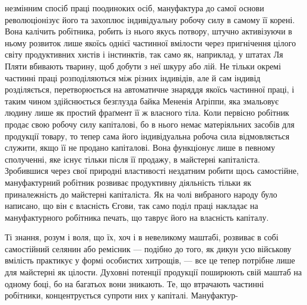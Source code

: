 \parcont{}  %
незмінним спосіб праці поодиноких осіб, мануфактура до самої
основи революціонізує його та захоплює індивідуальну робочу
силу в самому її корені. Вона калічить робітника, робить із нього
якусь потвору, штучно активізуючи в ньому розвиток лише
якоїсь однієї частинної вмілости через пригнічення цілого світу
продуктивних хистів і інстинктів, так само як, наприклад, у
штатах Ля Пляти вбивають тварину, щоб добути з неї шкуру
або лій. Не тільки окремі частинні праці розподіляються між
різних індивідів, але й сам індивід розділяється, перетворюється
на автоматичне знаряддя якоїсь частинної праці, і таким чином
здійснюється безглузда байка Мененія Аґріппи, яка змальовує
людину лише як простий фраґмент її ж власного тіла. Коли
первісно робітник продає свою робочу силу капіталові, бо в нього
немає матеріяльних засобів для продукції товару, то тепер сама
його індивідуальна робоча сила відмовляється служити, якщо
її не продано капіталові. Вона функціонує лише в певному сполученні,
яке існує тільки після її продажу, в майстерні капіталіста.
Зробившися через свої природні властивості нездатним робити
щось самостійне, мануфактурний робітник розвиває продуктивну
діяльність тільки як приналежність до майстерні капіталіста.
Як на чолі вибраного народу було написано, що він є власність
Єгови, так само поділ праці накладає на мануфактурного робітника
печать, що таврує його на власність капіталу.

Ті знання, розум і воля, що їх, хоч і в невеликому маштабі,
розвиває в собі самостійний селянин або ремісник — подібно до
того, як дикун усю військову вмілість практикує у формі особистих
хитрощів, — все це тепер потрібне лише для майстерні як цілости.
Духовні потенції продукції поширюють свій маштаб на одному
боці, бо на багатьох вони зникають. Те, що втрачають частинні
робітники, концентрується супроти них у капіталі. Мануфактур-
\parbreak{}  %

